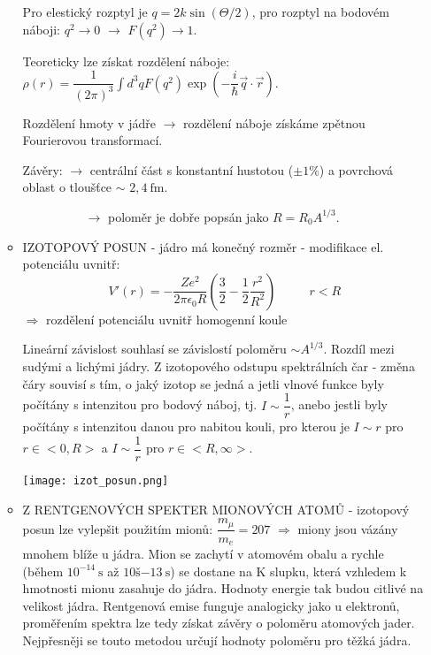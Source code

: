 \documentclass[../../main.tex]{subfiles}
\begin{document}
\begin{itemize}
\begin{itemize}
	    Pro elestický rozptyl je $q = 2k \sin (\Theta /2)$, pro rozptyl na bodovém náboji: $q^2 \rightarrow 0$ $\rightarrow$ $F(q^2) \rightarrow 1.$
	    
	    Teoreticky lze získat rozdělení náboje: $\rho (r) = \dfrac{1}{(2 \pi)^3} \int d^3 q F(q^2) \exp \left(-\dfrac{i}{\hbar} \vec{q}\cdot \vec{r}\right).$
	    
	    Rozdělení hmoty v jádře $\rightarrow$ rozdělení náboje získáme zpětnou Fourierovou transformací.
	    
	    Závěry: $\rightarrow$ centrální část s konstantní hustotou ($\pm 1 \%$) a povrchová oblast o tloušťce $\sim$ $2,4 ~\mathrm{fm}$.
	    
	    ~~~~~~~~~~$\rightarrow$ poloměr je dobře popsán jako $R = R_0 A^{1/3}$.
	    
	    \item IZOTOPOVÝ POSUN - jádro má konečný rozměr - modifikace el. potenciálu uvnitř: 
	    \begin{equation}
	    V'(r) = - \dfrac{Z e^2}{2 \pi \epsilon_0 R} \left( \dfrac{3}{2} - \dfrac{1}{2} \dfrac{r^2}{R^2}\right) ~~~~~~~~~~~~ r<R
	    \end{equation}
	    $\Rightarrow$ rozdělení potenciálu uvnitř homogenní koule
	    
	    Lineární závislost souhlasí se závislostí poloměru $\sim A^{1/3}$. Rozdíl mezi sudými a lichými jádry. Z izotopového odstupu spektrálních čar - změna čáry souvisí s tím, o jaký izotop se jedná a jetli vlnové funkce byly počítány s intenzitou pro bodový náboj, tj. $I \sim \dfrac{1}{r}$, anebo jestli byly počítány s intenzitou danou pro nabitou kouli, pro kterou je $I \sim r$ pro $r \in < 0,R>$ a $I \sim \dfrac{1}{r}$ pro $ r \in <R, \infty>$.
	    
	    	\begin{center}
	    		\texttt{[image: izot\_posun.png]}		
	    	\end{center}
	    
	    \item Z RENTGENOVÝCH SPEKTER MIONOVÝCH ATOMŮ - izotopový posun lze vylepšit použitím mionů: $\dfrac{m_ {\mu}}{m_e} = 207 $ $\Rightarrow$ miony jsou vázány mnohem blíže u jádra. Mion se zachytí v atomovém obalu a rychle (během $10^{-14} ~\mathrm{s}$ až $10š{-13} ~\mathrm{s}$) se dostane na K slupku, která vzhledem k hmotnosti mionu zasahuje do jádra. Hodnoty energie tak budou citlivé na velikost jádra. Rentgenová emise funguje analogicky jako u elektronů, proměřením spektra lze tedy získat závěry o poloměru atomových jader. Nejpřesněji se touto metodou určují hodnoty poloměru pro těžká jádra.
	    

\end{itemize}
\end{itemize}
\end{document}
